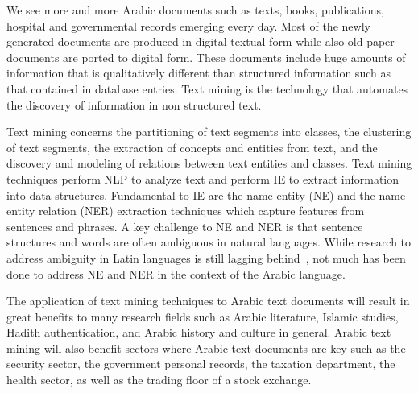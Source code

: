 \documentclass[12pt]{article}
\begin{document}
\begin{figure}
\end{figure}

We see more and more Arabic documents such as texts,
books, publications, hospital and governmental records emerging 
every day.
Most of the newly generated documents are produced in digital 
textual form while also old paper documents are ported to digital 
form.
These documents include huge amounts of information that is 
qualitatively different than structured information such as that 
contained in database entries.
Text mining is the technology that automates the discovery of 
information in non structured text.

Text mining concerns the partitioning of text segments into classes,
the clustering of text segments,
the extraction of concepts and entities from text,
and the discovery and modeling of relations between text entities 
and classes.
Text mining techniques perform NLP to analyze text and perform 
IE to extract information into data structures.
Fundamental to IE are the name entity (NE) and the name entity 
relation (NER) extraction techniques which capture features from 
sentences and phrases.
A key challenge to NE and NER is that sentence structures and 
words are often ambiguous in natural languages.
While research to address ambiguity in Latin languages is still 
lagging behind~\cite{Red08},
not much has been done to address NE and NER in the context of 
the Arabic language.

The application of text mining techniques to Arabic text documents 
will result in great benefits to many research fields such as 
Arabic literature,
Islamic studies, Hadith authentication, and Arabic history and 
culture in general.
Arabic text mining will also benefit sectors where Arabic text 
documents are key such as the security sector,
the government personal records,
the taxation department,
the health sector,
as well as the trading floor of a stock exchange.
 
\end{document}
